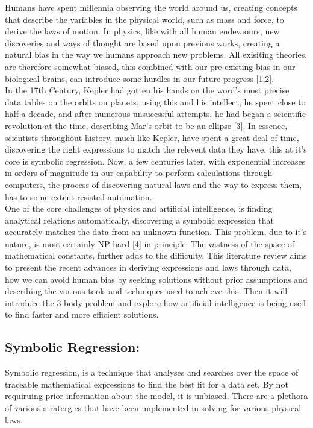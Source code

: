 \documentclass{article}
\begin{document}
Humans have spent millennia observing the world around us, creating concepts that describe the variables in the physical world, such as mass and force, to derive the laws of motion. In physics, like with all human endevaours, new discoveries and ways of thought are based upon previous works, creating a natural bias in the way we humans approach new problems. All exisiting theories, are therefore somewhat biased, this combined with our pre-existing bias in our biological brains, can introduce some hurdles in our future progress [1,2]. \\

In the 17th Century, Kepler had gotten his hands on the word's most precise data tables on the orbits on planets, using this and his intellect, he spent close to half a decade, and after numerous unsucessful attempts, he had began a scientific revolution at the time, describing Mar's orbit to be an ellipse [3]. In essence, scientists throughout history, much like Kepler, have spent a great deal of time, discovering the right expressions to match the relevent data they have, this at it's core is symbolic regression. Now, a few centuries later, with exponential increases in orders of magnitude in our capability to perform calculations through computers, the process of discovering natural laws and the way to express them, has to some extent resisted automation. \\

One of the core challenges of physics and artificial intelligence, is finding analytical relations automatically, discovering a symbolic expression that accurately matches the data from an unknown function. This problem, due to it's nature, is most certainly NP-hard [4] in principle. The vastness of the space of mathematical constants, further adds to the difficulty. This literature review aims to present the recent advances in deriving expressions and laws through data, how we can avoid human bias by seeking solutions without prior assumptions and describing the various tools and techniques used to achieve this. Then it will introduce the 3-body problem and explore how artificial intelligence is being used to find faster and more efficient solutions.\\ 

\subsection{Symbolic Regression: }

Symbolic regression, is a technique that analyses and searches over the space of traceable mathematical expressions to find the best fit for a data set. By not requiruing prior information about the model, it is unbiased. There are a plethora of various stratergies that have been implemented in solving for various physical laws.\\
\end{document}
